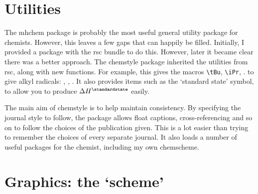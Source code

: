 \documentclass{article}
\providecommand*\pkg[1]{\textsf{#1}}
\begin{document}
\section{Utilities}

The \pkg{mhchem} package is probably the most useful general
utility package for chemists.  However, this leaves a few gaps
that can happily be filled.  Initially, I provided a package
with the \pkg{rsc} bundle to do this.  However, later it became
clear there was a better approach.  The \pkg{chemstyle} package
inherited the utilities from \pkg{rsc}, along with new
functions.  For example, this gives the macros \verb|\tBu|,
\verb|\iPr|, \etc. to give alkyl radicals: \tBu, \iPr, \etc. It
also provides items such as the `standard state' symbol, to
allow you to produce $\Delta H^{\standardstate}$ easily.

The main aim of \pkg{chemstyle} is to help maintain
consistency.  By specifying the journal style to follow, the
package allows float captions, cross-referencing and so on to
follow the choices of the publication given.  This is a lot
easier than trying to remember the choices of every separate
journal. It also loads a number of useful packages for the
chemist, including my own \pkg{chemscheme}.

\section{Graphics: the `scheme'}
\end{document}
